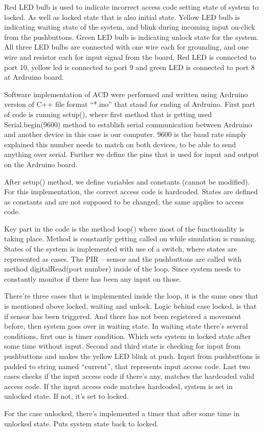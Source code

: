 Red LED bulb is used to indicate incorrect access code setting state of system to locked. As well as locked state that is also initial state. Yellow LED bulb is indicating waiting state of the system, and blink during incoming input on-click from the pushbuttons. Green LED bulb is indicating unlock state for the system. All three LED bulbs are connected with one wire each for grounding, and one wire and resistor each for input signal from the board. Red LED is connected to port 10, yellow led is connected to port 9 and green LED is connected to port 8 at Ardruino board. 

Software implementation of ACD were performed and written using Ardruino version of C++ file format “*.ino” that stand for ending of Ardruino. First part of code is running setup(), where first method that is getting used Serial.begin(9600) method to establish serial communication between Ardruino and another device in this case is our computer. 9600 is the baud rate simply explained this number needs to match on both devices, to be able to send anything over serial. Further we define the pins that is used for input and output on the Ardruino board. 
\newline

After setup() method, we define variables and constants (cannot be modified). For this implementation, the correct access code is hardcoded. States are defined as constants and are not supposed to be changed, the same applies to access code.
\newline

Key part in the code is the method loop() where most of the functionality is taking place. Method is constantly getting called on while simulation is running. States of the system is implemented with use of a switch, where states are represented as cases. The PIR – sensor and the pushbuttons are called with method digitalRead(port number) inside of the loop. Since system needs to constantly monitor if there has been any input on those.  
\newline

There’re three cases that is implemented inside the loop, it is the same ones that is mentioned above locked, waiting and unlock. Logic behind case locked, is that if sensor has been triggered. And there has not been registered a movement before, then system goes over in waiting state. In waiting state there’s several conditions, first one is timer condition. Which sets system in locked state after some time without input. Second and third state is checking for input from pushbuttons and makes the yellow LED blink at push. Input from pushbuttons is padded to string named “current”, that represents input access code. Last two cases checks if the input access code if there’s any, matches the hardcoded valid access code. If the input access code matches hardcoded, system is set in unlocked state. If not, it’s set to locked. 
\newline

For the case unlocked, there’s implemented a timer that after some time in unlocked state. Puts system state back to locked. 
